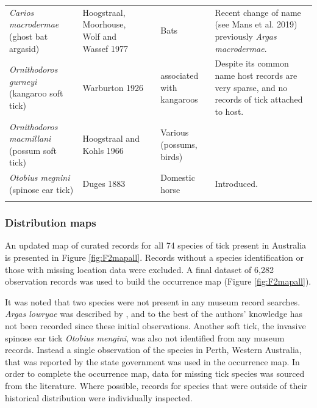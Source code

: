 \documentclass[a4paper, nobind]{templates/ociamthesis}
\begin{document}
\begin{landscape}
\begin{longtable}[t]{>{\raggedright\arraybackslash}p{4cm}>{\raggedright\arraybackslash}p{3cm}>{\raggedright\arraybackslash}p{1cm}>{\raggedright\arraybackslash}p{4cm}>{\raggedright\arraybackslash}p{6cm}}
\textit{Carios macrodermae} (ghost bat argasid) & Hoogstraal, Moorhouse, Wolf and Wassef 1977 & \multicolumn{1}{c}{\cellcolor[HTML]{BEBADA}{\textcolor{white}{N}}} & Bats & Recent change of name (see Mans et al. 2019) previously \textit{Argas macrodermae}.\\
\textit{Ornithodoros gurneyi} (kangaroo soft tick) & Warburton 1926 & \multicolumn{1}{c}{\cellcolor[HTML]{8DD3C7}{\textcolor{white}{Y}}} & associated with kangaroos & Despite its common name host records are very sparse, and no records of tick attached to host.\\
\textit{Ornithodoros macmillani} (possum soft tick) & Hoogstraal and Kohls 1966 & \multicolumn{1}{c}{\cellcolor[HTML]{BEBADA}{\textcolor{white}{N}}} & Various (possums, birds) & \\
\textit{Otobius megnini} (spinose ear tick) & Duges 1883 & \multicolumn{1}{c}{\cellcolor[HTML]{BEBADA}{\textcolor{white}{N}}} & Domestic horse & Introduced.\\*
\end{longtable}
\endgroup{}
\end{landscape}

\newpage

\hypertarget{distribution-maps}{%
\subsubsection{Distribution maps}\label{distribution-maps}}

An updated map of curated records for all 74 species of tick present in Australia is presented in Figure \ref{fig:F2mapall}.
Records without a species identification or those with missing location data were excluded.
A final dataset of 6,282 observation records was used to build the occurrence map (Figure \ref{fig:F2mapall}).

It was noted that two species were not present in any museum record searches.
\emph{Argas lowryae} was described by \textcite{kaiserObservationsSubgenusArgas1975}, and to the best of the authors' knowledge has not been recorded since these initial observations.
Another soft tick, the invasive spinose ear tick \emph{Otobius mengini}, was also not identified from any museum records.
Instead a single observation of the species in Perth, Western Australia, that was reported by the state government \autocite{mayberrySpinoseEarTick2003} was used in the occurrence map.
In order to complete the occurrence map, data for missing tick species was sourced from the literature.
Where possible, records for species that were outside of their historical distribution were individually inspected.
\end{document}
